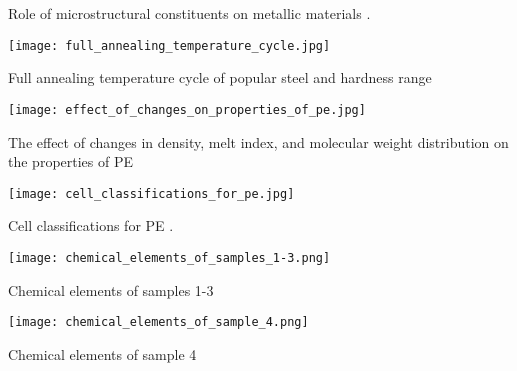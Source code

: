 {\begin{table}[H]
\caption{Role of microstructural constituents on metallic materials \cite{suryanarayana2017microstructure}.}
\label{appendix:c:5}
\end{table}}

\begin{table}[H]
    \texttt{[image: full\_annealing\_temperature\_cycle.jpg]}
    \caption{Full annealing temperature cycle of popular steel and hardness range \cite{singh2020applied}}
\end{table}

\begin{table}[H]
    \texttt{[image: effect\_of\_changes\_on\_properties\_of\_pe.jpg]}
    \caption{The effect of changes in density, melt index, and molecular weight distribution on the properties of PE \cite{gabriel1998history}}
\end{table}

\begin{table}[H]
    \texttt{[image: cell\_classifications\_for\_pe.jpg]}
    \caption{Cell classifications for PE \cite{meola2005cross}.}
\end{table}

\begin{table}[H]
    \texttt{[image: chemical\_elements\_of\_samples\_1-3.png]}
    \caption{Chemical elements of samples 1-3}
\end{table}

\begin{table}[H]
    \texttt{[image: chemical\_elements\_of\_sample\_4.png]}
    \caption{Chemical elements of sample 4}
\end{table}